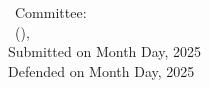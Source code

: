\hfill
\vfill
\small
\begin{flushleft}
	\textbf{\thesisAuthorName} \\
	\textit{\thesisTitle} \\
	\thesisSubject~Committee:\\
	\quad\thesisFirstReviewer~{\small(\thesisFirstReviewerUniversity)},\\
	Submitted on Month Day, 2025\\
	Defended on Month Day, 2025
\end{flushleft}

\begin{flushleft}
	\textbf{\thesisUniversity} \\
	\thesisUniversityDepartment \\
	\thesisUniversityGroup \\
	\thesisUniversityStreetAddress \\
	\thesisUniversityPostalCode~\thesisUniversityCity
\end{flushleft}
